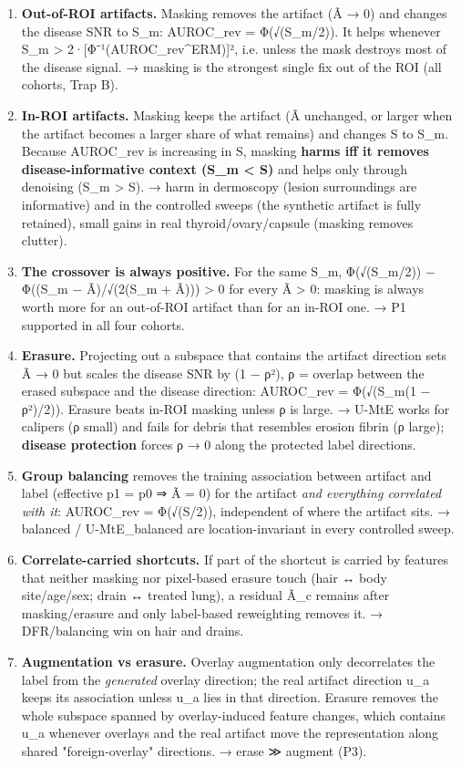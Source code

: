 {\begin{enumerate}
\item
  \textbf{Out-of-ROI artifacts.} Masking removes the artifact (Ã → 0) and changes the disease SNR to S\_m:
  AUROC\_rev = Φ(√(S\_m/2)). It helps whenever S\_m \textgreater{} 2·{[}Φ⁻¹(AUROC\_rev\^{}ERM){]}², i.e. unless the mask destroys most of the
  disease signal. → masking is the strongest single fix out of the ROI (all cohorts, Trap B).
\item
  \textbf{In-ROI artifacts.} Masking keeps the artifact (Ã unchanged, or larger when the artifact becomes a larger share of
  what remains) and changes S to S\_m. Because AUROC\_rev is increasing in S, masking \textbf{harms iff it removes
  disease-informative context (S\_m \textless{} S)} and helps only through denoising (S\_m \textgreater{} S). → harm in dermoscopy (lesion
  surroundings are informative) and in the controlled sweeps (the synthetic artifact is fully retained), small gains in
  real thyroid/ovary/capsule (masking removes clutter).
\item
  \textbf{The crossover is always positive.} For the same S\_m, Φ(√(S\_m/2)) − Φ((S\_m − Ã)/√(2(S\_m + Ã))) \textgreater{} 0 for every Ã \textgreater{} 0:
  masking is always worth more for an out-of-ROI artifact than for an in-ROI one. → P1 supported in all four cohorts.
\item
  \textbf{Erasure.} Projecting out a subspace that contains the artifact direction sets Ã → 0 but scales the disease SNR by
  (1 − ρ²), ρ = overlap between the erased subspace and the disease direction: AUROC\_rev = Φ(√(S\_m(1 − ρ²)/2)).
  Erasure beats in-ROI masking unless ρ is large. → U-MtE works for calipers (ρ small) and fails for debris that
  resembles erosion fibrin (ρ large); \textbf{disease protection} forces ρ → 0 along the protected label directions.
\item
  \textbf{Group balancing} removes the training association between artifact and label (effective p1 = p0 ⇒ Ã = 0) for the
  artifact \emph{and everything correlated with it}: AUROC\_rev = Φ(√(S/2)), independent of where the artifact sits.
  → balanced / U-MtE\_balanced are location-invariant in every controlled sweep.
\item
  \textbf{Correlate-carried shortcuts.} If part of the shortcut is carried by features that neither masking nor pixel-based
  erasure touch (hair ↔ body site/age/sex; drain ↔ treated lung), a residual Ã\_c remains after masking/erasure and only
  label-based reweighting removes it. → DFR/balancing win on hair and drains.
\item
  \textbf{Augmentation vs erasure.} Overlay augmentation only decorrelates the label from the \emph{generated} overlay direction;
  the real artifact direction u\_a keeps its association unless u\_a lies in that direction. Erasure removes the whole
  subspace spanned by overlay-induced feature changes, which contains u\_a whenever overlays and the real artifact move
  the representation along shared "foreign-overlay" directions. → erase ≫ augment (P3).
\end{enumerate}

}
